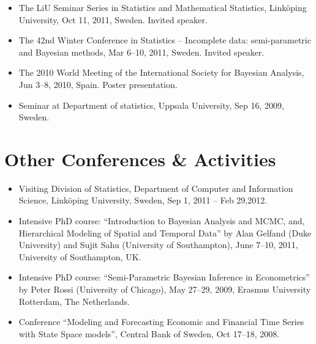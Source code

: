 \documentclass[twoside,a4paper]{article}
\begin{document}
\begin{itemize}
\item The LiU Seminar Series in Statistics and Mathematical Statistics, Linköping University, Oct 11, 2011, Sweden. Invited speaker.

\item The 42nd Winter Conference in Statistics -- Incomplete data: semi-parametric and Bayesian methods, Mar 6--10, 2011, Sweden. Invited speaker.

\item The 2010 World Meeting of the International Society for Bayesian Analysis, Jun 3--8, 2010, Spain. Poster presentation.

\item Seminar at Department of statistics, Uppsala University, Sep 16, 2009, Sweden.

\end{itemize}


\section{Other Conferences \& Activities}
\begin{itemize}
\item Visiting Division of Statistics, Department of Computer and Information Science, Linköping University, Sweden, Sep 1, 2011 -- Feb 29,2012.

\item Intensive PhD course: ``Introduction to Bayesian Analysis and MCMC, and, Hierarchical Modeling of Spatial and Temporal Data'' by Alan Gelfand (Duke University) and Sujit Sahu (University of Southampton), June 7--10, 2011, University of Southampton, UK.

\item Intensive PhD course: ``Semi-Parametric Bayesian Inference in Econometrics'' by Peter Rossi (University of Chicago), May 27--29, 2009, Erasmus University Rotterdam, The Netherlands.

\item Conference ``Modeling and Forecasting Economic and Financial Time Series with State Space models'', Central Bank of Sweden, Oct 17--18, 2008.
\end{itemize}
\end{document}
